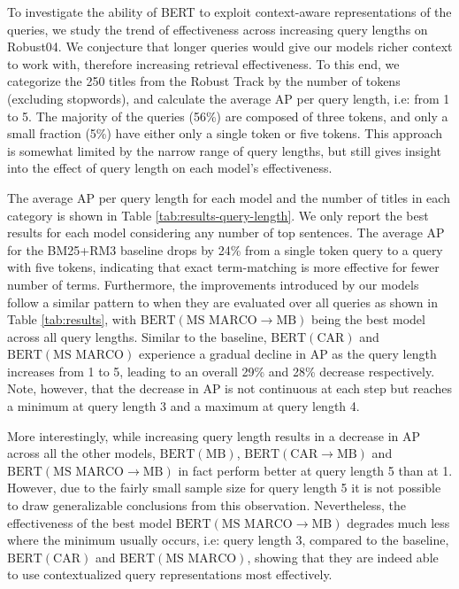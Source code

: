 To investigate the ability of BERT to exploit context-aware representations of the queries, we study the trend of effectiveness across increasing query lengths on Robust04.
We conjecture that longer queries would give our models richer context to work with, therefore increasing retrieval effectiveness.
To this end, we categorize the 250 titles from the Robust Track by the number of tokens (excluding stopwords), and calculate the average AP per query length, i.e: from 1 to 5.
The majority of the queries (56\%) are composed of three tokens, and only a small fraction (5\%) have either only a single token or five tokens.
This approach is somewhat limited by the narrow range of query lengths, but still gives insight into the effect of query length on each model's effectiveness.

The average AP per query length for each model and the number of titles in each category is shown in Table \ref{tab:results-query-length}.
We only report the best results for each model considering any number of top sentences.
The average AP for the BM25+RM3 baseline drops by 24\% from a single token query to a query with five tokens, indicating that exact term-matching is more effective for fewer number of terms.
Furthermore, the improvements introduced by our models follow a similar pattern to when they are evaluated over all queries as shown in Table \ref{tab:results}, with $ \textrm{BERT}(\textrm{MS MARCO}\rightarrow\textrm{MB}) $ being the best model across all query lengths.
Similar to the baseline, $ \textrm{BERT}(\textrm{CAR}) $ and $ \textrm{BERT}(\textrm{MS MARCO}) $ experience a gradual decline in AP as the query length increases from 1 to 5, leading to an overall 29\% and 28\% decrease respectively.
Note, however, that the decrease in AP is not continuous at each step but reaches a minimum at query length 3 and a maximum at query length 4.

More interestingly, while increasing query length results in a decrease in AP across all the other models, $ \textrm{BERT}(\textrm{MB}) $, $ \textrm{BERT}(\textrm{CAR}\rightarrow\textrm{MB}) $ and $ \textrm{BERT}(\textrm{MS MARCO}\rightarrow\textrm{MB}) $ in fact perform better at query length 5 than at 1.
However, due to the fairly small sample size for query length 5 it is not possible to draw generalizable conclusions from this observation.
Nevertheless, the effectiveness of the best model  $ \textrm{BERT}(\textrm{MS MARCO}\rightarrow\textrm{MB}) $ degrades much less where the minimum usually occurs, i.e: query length 3, compared to the baseline, $ \textrm{BERT}(\textrm{CAR}) $ and $ \textrm{BERT}(\textrm{MS MARCO}) $, showing that they are indeed able to use contextualized query representations most effectively.

